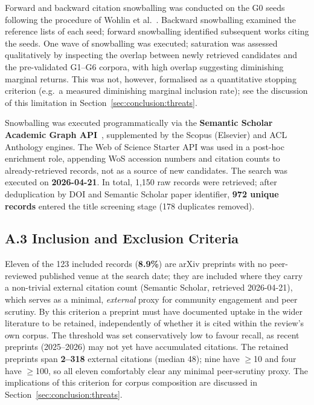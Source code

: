 Forward and backward citation snowballing was conducted on the G0 seeds
following the procedure of Wohlin et al.~\cite{Wohlin2014}. Backward
snowballing examined the reference lists of each seed; forward snowballing
identified subsequent works citing the seeds. One wave of snowballing was
executed; saturation was assessed qualitatively by inspecting the overlap
between newly retrieved candidates and the pre-validated G1--G6 corpora, with
high overlap suggesting diminishing marginal returns. This was not, however,
formalised as a quantitative stopping criterion (e.g.\ a measured diminishing
marginal inclusion rate); see the discussion of this limitation in
Section~\ref{sec:conclusion:threats}.

Snowballing was executed programmatically via the \textbf{Semantic Scholar
Academic Graph API}~\cite{SemanticScholar2023}, supplemented by the Scopus
(Elsevier) and ACL Anthology engines. The Web of Science Starter API was used
in a post-hoc enrichment role, appending WoS accession numbers and citation
counts to already-retrieved records, not as a source of new candidates. The
search was executed on \textbf{2026-04-21}. In total, 1,150 raw records were
retrieved; after deduplication by DOI and Semantic Scholar paper identifier,
\textbf{972 unique records} entered the title screening stage (178 duplicates
removed).

\subsection*{A.3 Inclusion and Exclusion Criteria}

Eleven of the 123 included records (\textbf{8.9\%}) are arXiv preprints with
no peer-reviewed published venue at the search date; they are included where
they carry a non-trivial external citation count (Semantic Scholar, retrieved
2026-04-21), which serves as a minimal, \emph{external} proxy for
community engagement and peer scrutiny. By this criterion a preprint must have
documented uptake in the wider literature to be retained, independently of
whether it is cited within the review's own corpus. The threshold was set
conservatively low to favour recall, as recent preprints (2025--2026) may not
yet have accumulated citations. The retained preprints span \textbf{2--318}
external citations (median 48); nine have $\geq$10 and four have $\geq$100,
so all eleven comfortably clear any minimal peer-scrutiny proxy. The
implications of this criterion for corpus composition are discussed in
Section~\ref{sec:conclusion:threats}.

